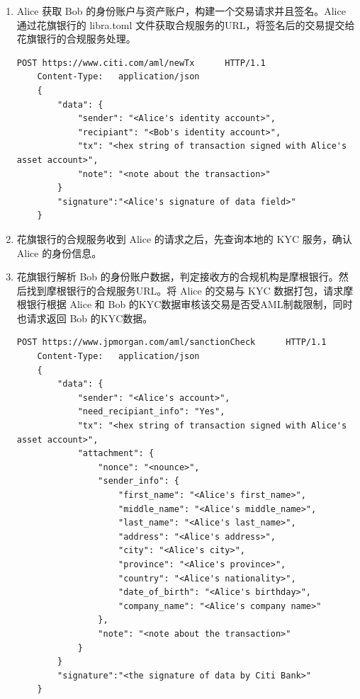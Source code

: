 \begin{enumerate}
    \item Alice 获取 Bob 的身份账户与资产账户，构建一个交易请求并且签名。Alice 通过花旗银行的 libra.toml 文件获取合规服务的URL，将签名后的交易提交给花旗银行的合规服务处理。
    
    \begin{lstlisting}[caption={Alice 请求花旗银行审核交易}, label={lst:alice_request}]
    POST https://www.citi.com/aml/newTx      HTTP/1.1
    Content-Type:   application/json
    {
        "data": {
            "sender": "<Alice's identity account>",
            "recipiant": "<Bob's identity account>",
            "tx": "<hex string of transaction signed with Alice's asset account>",
            "note": "<note about the transaction>"
        }
        "signature":"<Alice's signature of data field>"
    }
    \end{lstlisting}

    \item 花旗银行的合规服务收到 Alice 的请求之后，先查询本地的 KYC 服务，确认 Alice 的身份信息。

    \item 花旗银行解析 Bob 的身份账户数据，判定接收方的合规机构是摩根银行。然后找到摩根银行的合规服务URL。将 Alice 的交易与 KYC 数据打包，请求摩根银行根据 Alice 和 Bob 的KYC数据审核该交易是否受AML制裁限制，同时也请求返回 Bob 的KYC数据。

    \begin{lstlisting}[caption={花旗银行请求摩根银行审核交易}, label={lst:citi_request}]
    POST https://www.jpmorgan.com/aml/sanctionCheck      HTTP/1.1
    Content-Type:   application/json
    {
        "data": {
            "sender": "<Alice's account>",
            "need_recipiant_info": "Yes",
            "tx": "<hex string of transaction signed with Alice's asset account>",
            "attachment": {
                "nonce": "<nounce>",
                "sender_info": {
                    "first_name": "<Alice's first_name>",
                    "middle_name": "<Alice's middle_name>",
                    "last_name": "<Alice's last_name>",
                    "address": "<Alice's address>",
                    "city": "<Alice's city>",
                    "province": "<Alice's province>",
                    "country": "<Alice's nationality>",
                    "date_of_birth": "<Alice's birthday>",
                    "company_name": "<Alice's company name>"
                },
                "note": "<note about the transaction>"
            }
        }
        "signature":"<the signature of data by Citi Bank>"
    }
    \end{lstlisting}


\end{enumerate}
